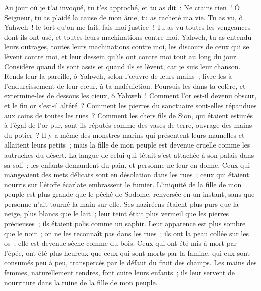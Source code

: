 \begin{multicols}{2}
Au jour où je t'ai invoqué, tu t'es approché, et tu as dit~: Ne crains rien~!
 Ô Seigneur, tu as plaidé la cause de mon âme, tu as racheté ma vie.
Tu as vu, ô Yahweh~! le tort qu'on me fait, fais-moi justice~!
Tu as vu toutes les vengeances dont ils ont usé, et toutes leurs machinations contre moi.
 Yahweh, tu as entendu leurs outrages, toutes leurs machinations contre moi,
les discours de ceux qui se lèvent contre moi, et leur dessein qu'ils ont contre moi tout au long du jour.
Considère quand ils sont assis et quand ils se lèvent, car je suis leur chanson.
 Rends-leur la pareille, ô Yahweh, selon l'œuvre de leurs mains~;
livre-les à l'endurcissement de leur cœur, à ta malédiction.
Poursuis-les dans ta colère, et extermine-les de dessous les cieux, ô Yahweh~!
\VerseOne{} Comment l'or est-il devenu obscur, et le fin or s'est-il altéré~? Comment les pierres du sanctuaire sont-elles répandues aux coins de toutes les rues~?
 Comment les chers fils de Sion, qui étaient estimés à l'égal de l'or pur, sont-ils réputés comme des vases de terre, ouvrage des mains du potier~?
 Il y a même des monstres marins qui présentent leurs mamelles et allaitent leurs petits~; mais la fille de mon peuple est devenue cruelle comme les autruches du désert.
 La langue de celui qui tétait s'est attachée à son palais dans sa soif~; les enfants demandent du pain, et personne ne leur en donne.
 Ceux qui mangeaient des mets délicats sont en désolation dans les rues~; ceux qui étaient nourris sur l'étoffe écarlate embrassent le fumier.
 L'iniquité de la fille de mon peuple est plus grande que le péché de Sodome, renversée en un instant, sans que personne n'ait tourné la main sur elle.
 Ses naziréens étaient plus purs que la neige, plus blancs que le lait~; leur teint était plus vermeil que les pierres précieuses~; ils étaient polis comme un saphir.
 Leur apparence est plus sombre que le noir~; on ne les reconnaît pas dans les rues~; ils ont la peau collée sur les os~; elle est devenue sèche comme du bois.
 Ceux qui ont été mis à mort par l'épée, ont été plus heureux que ceux qui sont morts par la famine, qui eux sont consumés peu à peu, transpercés par le défaut du fruit des champs.
 Les mains des femmes, naturellement tendres, font cuire leurs enfants~; ils leur servent de nourriture dans la ruine de la fille de mon peuple.

\end{multicols}
